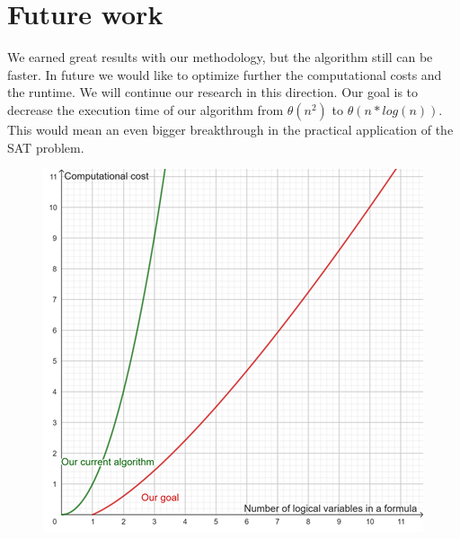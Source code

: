 \documentclass{article}
\begin{document}
\section{Future work}

We earned great results with our methodology, but the algorithm still can be faster.
In future we would like to optimize further the computational costs and the runtime.
We will continue our research in this direction.
Our goal is to decrease the execution time of our algorithm from $\theta(n^2)$ to $\theta (n*log(n))$. This would mean an even bigger breakthrough in the practical application of the SAT problem. 
\begin{figure}[h]
    \centering
    \includegraphics[width=0.5\linewidth]{img/futurework.png}
\end{figure}
\end{document}

